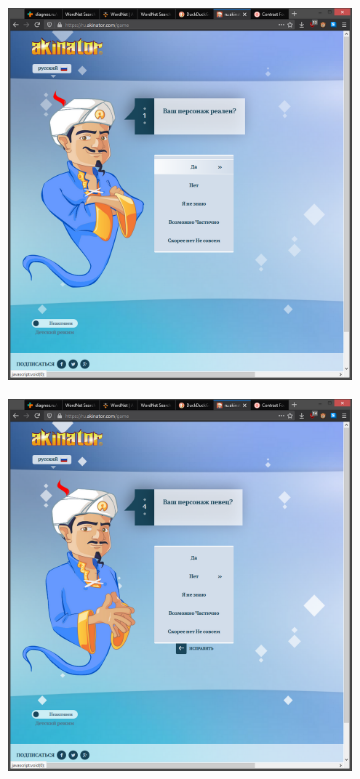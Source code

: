 \documentclass[
  a4paper,
  oneside,
  BCOR = 10mm,
  DIV = 12,
  12pt,
  headings = normal,
]{scrartcl}
\newlength{\gridunitwidth}
\begin{document}
      \begin{figure}[!htbp]
        \begin{subfigure}[b]{6 \gridunitwidth - 1em /2}
          \includegraphics[width = \columnwidth]{./assets/12.png}
          \caption{}
          \label{subfig:akinator-01}
        \end{subfigure}%
        \hspace{1em}%
        \begin{subfigure}[b]{6 \gridunitwidth - 1em /2}
          \includegraphics[width = \columnwidth]{./assets/13.png}

\end{subfigure}
\end{figure}
\end{document}
